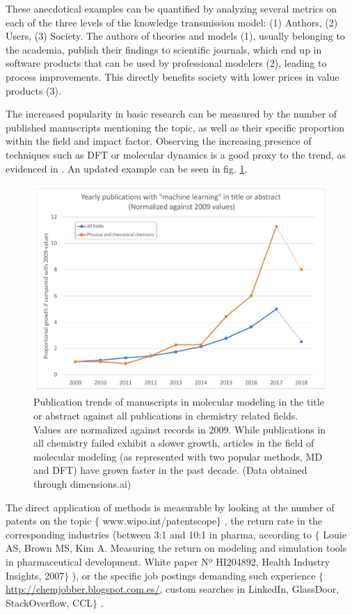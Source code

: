 These anecdotical examples can be quantified by analyzing several metrics on each of the three levels of the knowledge transmission model:\cite{warry2006} (1) Authors, (2) Users, (3) Society. The authors of theories and models (1), usually belonging to the academia, publish their findings to scientific journals, which end up in software products that can be used by professional modelers (2), leading to process improvements. This directly benefits society with lower prices in value products (3).

The increased popularity in basic research can be measured by the number of published manuscripts mentioning the topic, as well as their specific proportion within the field and impact factor. Observing the increasing presence of techniques such as DFT or molecular dynamics is a good proxy to the trend, as evidenced in \citet{maginn2009}. An updated example can be seen in fig. \ref{fig:pubtrends}.


\begin{figure}[H]
	\includegraphics[width=\textwidth]{./figures/01/publication-trends_crop.pdf}
	\caption[Publication trends in molecular modeling]{Publication trends of manuscripts in molecular modeling in the title or abstract against all publications in chemistry related fields. Values are normalized against records in 2009. While publications in all chemistry failed exhibit a slower growth, articles in the field of molecular modeling (as represented with two popular methods, MD and DFT) have grown faster in the past decade. (Data obtained through dimensions.ai)}
	\label{fig:pubtrends}
\end{figure}


The direct application of methods is measurable by looking at the number of patents on the topic $ \{ $ www.wipo.int/patentscope$ \} $ , the return rate in the corresponding industries (between 3:1 and 10:1 in pharma, according to $ \{ $ Louie AS, Brown MS, Kim A. Measuring the return on modeling and simulation tools in pharmaceutical development. White paper Nº HI204892, Health Industry Insights, 2007$ \} $ ), or the specific job postings demanding such experience $ \{ $ \href{http://chemjobber.blogspot.com.es/}{http://chemjobber.blogspot.com.es/}, custom searches in LinkedIn, GlassDoor, StackOverflow, CCL$ \} $ .

